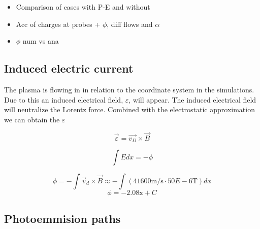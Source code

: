 \begin{itemize}
	\item Comparison of cases with P-E and without
	\item Acc of charges at probes + $\phi$, diff flows and $\alpha$
	\item $\phi$ num vs ana
\end{itemize}

\subsection{Induced electric current}
	The plasma is flowing in in relation to the coordinate system in the simulations.
	Due to this an induced electrical field, \(\varepsilon\), will appear.
	The induced electrical field will neutralize the Lorentz force.
	Combined with the electrostatic approximation we can obtain the \(\varepsilon\)

	\begin{equation}
		\vec{\varepsilon} = \vec{v_D}\times \vec{B}
	\end{equation}

	\begin{equation}
		\int{Edx} = -\phi
	\end{equation}

	\begin{equation}
		\phi = -\int \vec{v}_d\times\vec{B} \approx -\int \left( 41600 \text{m/s}\cdot 50E-6 \text{T} \right) dx
	\end{equation}
	\begin{equation}
		\phi = -2.08 \text{x} + C
	\end{equation}

\subsection{Photoemmision paths}

